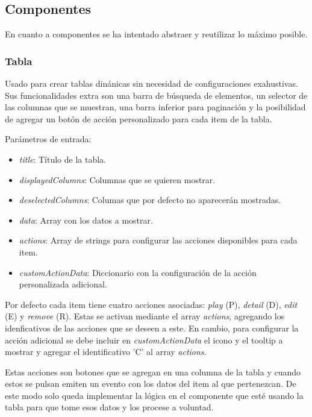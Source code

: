 \subsection{Componentes}


En cuanto a componentes se ha intentado abstraer y reutilizar lo máximo posible.


\subsubsection{Tabla}


Usado para crear tablas dinánicas sin necesidad de configuraciones exahustivas. Sus funcionalidades extra son una barra de búsqueda de elementos, un selector de las columnas que se muestran, una barra inferior para paginación y la posibilidad de agregar un botón de acción personalizado para cada item de la tabla. 

\bigskip
Parámetros de entrada:
\begin{itemize}
	\item \textit{title}: Título de la tabla.
	\item \textit{displayedColumns}: Columnas que se quieren mostrar.
	\item \textit{deselectedColumns}: Columas que por defecto no aparecerán mostradas.
	\item \textit{data}: Array con los datos a mostrar.
	\item \textit{actions}: Array de strings para configurar las acciones disponibles para cada item.
	\item \textit{customActionData}: Diccionario con la configuración de la acción personalizada adicional.
\end{itemize}

Por defecto cada item tiene cuatro acciones asociadas: \textit{play} (P), \textit{detail} (D), \textit{edit} (E) y \textit{remove} (R). Estas se activan mediante el array \textit{actions}, agregando los idenficativos de las acciones que se deseen a este. En cambio, para configurar la acción adicional se debe incluir en \textit{customActionData} el icono y el tooltip a mostrar y agregar el identificativo 'C' al array \textit{actions}.

Estas acciones son botones que se agregan en una columna de la tabla y cuando estos se pulsan emiten un evento con los datos del item al que pertenezcan. De este modo solo queda implementar la lógica en el componente que esté usando la tabla para que tome esos datos y los procese a voluntad.

